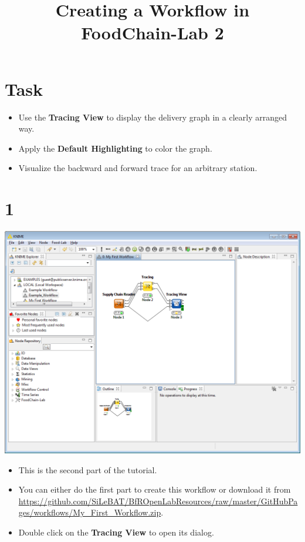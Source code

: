 \documentclass{beamer}
\title{Creating a Workflow in FoodChain-Lab 2}
\date{}
\begin{document}
\maketitle

\section{Task}
\begin{frame}
	\begin{itemize}
		\item Use the \textbf{Tracing View} to display the delivery graph in a clearly arranged way.
		\item Apply the \textbf{Default Highlighting} to color the graph.
		\item Visualize the backward and forward trace for an arbitrary station.
	\end{itemize}
\end{frame}
 
\section{1}
\begin{frame}
	\begin{center}
  		\includegraphics[height=0.6\textheight]{1.png}
	\end{center}
	\begin{itemize}
		\item This is the second part of the tutorial.
		\item You can either do the first part to create this workflow or download it from \url{https://github.com/SiLeBAT/BfROpenLabResources/raw/master/GitHubPages/workflows/My_First_Workflow.zip}.
		\item Double click on the \textbf{Tracing View} to open its dialog.
	\end{itemize}
\end{frame}
\end{document}
